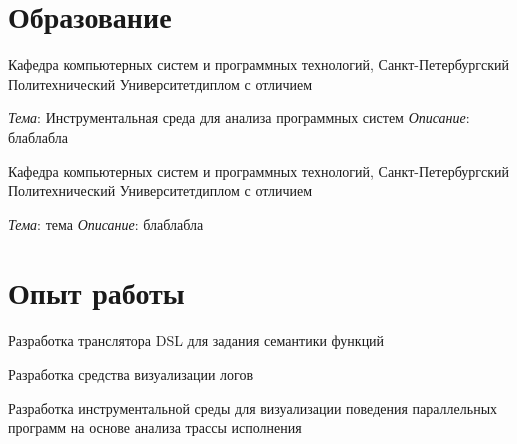 \documentclass[11pt, a4paper, russian]{moderncv}
\begin{document}
\makecvtitle

\section{Образование}

{\newline Кафедра компьютерных систем и программных технологий, Санкт-Петербургский Политехнический Университет}{диплом с отличием}{}{}

{\newline \textit{Тема}: Инструментальная среда для анализа программных систем}
{\newline \textit{Описание}: блаблабла}{}{}{}

{\newline Кафедра компьютерных систем и программных технологий, Санкт-Петербургский Политехнический Университет}{диплом с отличием}{}{}

{\newline \textit{Тема}: тема}
{\newline \textit{Описание}: блаблабла}{}{}{}

\section{Опыт работы}

{\newline Разработка транслятора DSL для задания семантики функций}{}{}{}

{\newline Разработка средства визуализации логов}{}{}{}

{\newline Разработка инструментальной среды для визуализации поведения параллельных программ
на основе анализа трассы исполнения}{}{}{}
\end{document}
